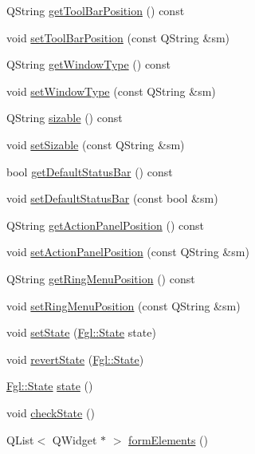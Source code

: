 \begin{DoxyCompactItemize}
\item 
QString \hyperlink{classFglForm_ac138a537d43b85e677818e1a61f3cd3d}{getToolBarPosition} () const 
\item 
void \hyperlink{classFglForm_af3b00991b1e002fe156d0298468a2311}{setToolBarPosition} (const QString \&sm)
\item 
QString \hyperlink{classFglForm_a1e47b1b987a50ed9e4155bdf0664feba}{getWindowType} () const 
\item 
void \hyperlink{classFglForm_ad780eff8bf0437a8e33a9115885718e9}{setWindowType} (const QString \&sm)
\item 
QString \hyperlink{classFglForm_a714fbe1dca04c76d368a8a429b6322c1}{sizable} () const 
\item 
void \hyperlink{classFglForm_a805e33b8b74b0cc73dad05eac238f9db}{setSizable} (const QString \&sm)
\item 
bool \hyperlink{classFglForm_a9cacfea35fa0152d42b399fc6d2a2524}{getDefaultStatusBar} () const 
\item 
void \hyperlink{classFglForm_a4b2f8754ef3aa90fc46d04c2020ed5af}{setDefaultStatusBar} (const bool \&sm)
\item 
QString \hyperlink{classFglForm_a1d53398b0bf7a81f7d6f4fab65faa3dd}{getActionPanelPosition} () const 
\item 
void \hyperlink{classFglForm_a80b78ad88d0dc22b7f4df7a724794a13}{setActionPanelPosition} (const QString \&sm)
\item 
QString \hyperlink{classFglForm_a773cd80cab1ae1efaccc48262b2cbc55}{getRingMenuPosition} () const 
\item 
void \hyperlink{classFglForm_af25c944e246c0522cd333e452ead9cad}{setRingMenuPosition} (const QString \&sm)
\item 
void \hyperlink{classFglForm_a5f6285fdf157e863c68402ec8147c53a}{setState} (\hyperlink{namespaceFgl_a66700792cb225549384ae76c1057cf22}{Fgl::State} state)
\item 
void \hyperlink{classFglForm_a4d2edce15aac96b22d221a11c0e7681e}{revertState} (\hyperlink{namespaceFgl_a66700792cb225549384ae76c1057cf22}{Fgl::State})
\item 
\hyperlink{namespaceFgl_a66700792cb225549384ae76c1057cf22}{Fgl::State} \hyperlink{classFglForm_aeed42adf5a051006db1742e2b48617e1}{state} ()
\item 
void \hyperlink{classFglForm_a0ef6e6d0ddf327e89c3e2d54be8548a6}{checkState} ()
\item 
QList$<$ QWidget $\ast$ $>$ \hyperlink{classFglForm_ab40c533416d35aac75f2ccf5157a3cf2}{formElements} ()

\end{DoxyCompactItemize}
